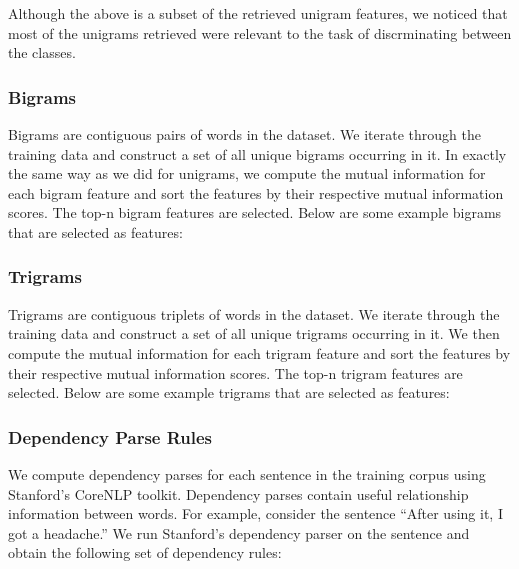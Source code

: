 \documentclass{acm_proc_article-sp}
\begin{document}
Although the above is a subset of the retrieved unigram features, we noticed that most of the unigrams retrieved were relevant to the task of  discrminating between the classes.

\subsubsection{Bigrams}
Bigrams are contiguous pairs of words in the dataset. We iterate through the training data and construct a set of all unique bigrams occurring in it. In exactly the same way as we did for unigrams, we compute the mutual information for each bigram feature and sort the features by their respective mutual information scores. The top-n bigram features are selected. Below are some example bigrams that are selected as features:

\noindent{}

\subsubsection{Trigrams}
Trigrams are contiguous triplets of words in the dataset. We iterate through the training data and construct a set of all unique trigrams occurring in it. We then compute the mutual information for each trigram feature and sort the features by their respective mutual information scores. The top-n trigram features are selected. Below are some example trigrams that are selected as features:

\noindent{}

\subsubsection{Dependency Parse Rules}
We compute dependency parses for each sentence in the training corpus using Stanford's CoreNLP toolkit. Dependency parses contain useful relationship information between words. For example, consider the sentence ``After using it, I got a headache.'' We run Stanford's dependency parser on the sentence and obtain the following set of dependency rules:
\end{document}
